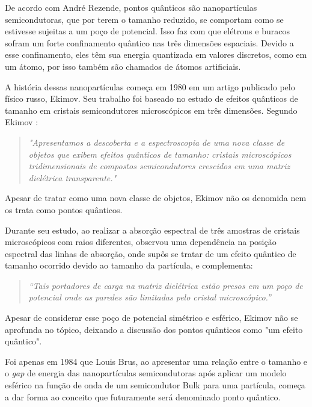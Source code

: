 \par De acordo com André Rezende\cite{introducao1}, pontos quânticos são nanopartículas semicondutoras, que por terem o tamanho reduzido, se comportam como se estivesse sujeitas a um poço de potencial. Isso faz com que elétrons e buracos sofram um forte confinamento quântico nas três dimensões espaciais. Devido a esse confinamento, eles têm sua energia quantizada em valores discretos, como em um átomo, por isso também são chamados de átomos artificiais.

\par A história dessas nanopartículas começa em 1980 em um artigo publicado pelo físico russo, Ekimov. Seu trabalho foi baseado no estudo de efeitos quânticos de tamanho em cristais semicondutores microscópicos em três dimensões. Segundo Ekimov \cite{introducao2}:

\begin{quote}
\textit{"Apresentamos a descoberta e a espectroscopia de uma nova classe de objetos que exibem efeitos quânticos de tamanho: cristais microscópicos tridimensionais de compostos semicondutores crescidos em uma matriz dielétrica transparente."}
\end{quote}

\par Apesar de tratar como uma nova classe de objetos, Ekimov não os denomida nem os trata como pontos quânticos.

\par Durante seu estudo, ao realizar a absorção espectral de três amostras de cristais microscópicos com raios diferentes, observou uma dependência na posição espectral das linhas de absorção, onde supôs se tratar de um efeito quântico de tamanho ocorrido devido ao tamanho da partícula, e complementa:

\begin{quote}
\textit{“Tais portadores de carga na matriz dielétrica estão presos em um poço de potencial onde as paredes são limitadas pelo cristal microscópico.”}
\end{quote}

\par Apesar de considerar esse poço de potencial simétrico e esférico, Ekimov não se aprofunda no tópico, deixando a discussão dos pontos quânticos como "um efeito quântico".

\par Foi apenas em 1984 que Louis Brus, ao apresentar uma relação entre o tamanho e o \textit{gap} de energia das nanopartículas semicondutoras após aplicar um modelo esférico na função de onda de um semicondutor Bulk para uma partícula, começa a dar forma ao conceito que futuramente será denominado ponto quântico.

